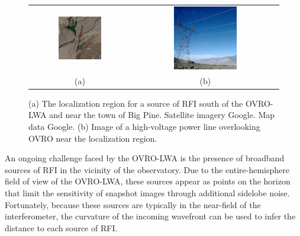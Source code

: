 \begin{bibunit}
\begin{figure}
    \centering
    \begin{tabular}{cc}
        \includegraphics[width=0.45\textwidth]{figures/chapter2/google-maps-rfi-localization} &
        \includegraphics[width=0.45\textwidth]{figures/chapter2/power-line-picture} \\
        (a) & (b) \\
    \end{tabular}
    \caption{
        (a) The localization region for a source of RFI south of the OVRO-LWA and near the town of
        Big Pine. Satellite imagery  Google. Map data  Google.
        (b) Image of a high-voltage power line overlooking OVRO near the localization region.
    }
    \label{fig:rfi-localization}
\end{figure}

An ongoing challenge faced by the OVRO-LWA is the presence of broadband sources of RFI in the
vicinity of the observatory. Due to the entire-hemisphere field of view of the OVRO-LWA, these
sources appear as points on the horizon that limit the sensitivity of snapshot images through
additional sidelobe noise. Fortunately, because these sources are typically in the near-field of the
interferometer, the curvature of the incoming wavefront can be used to infer the distance to each
source of RFI.


\end{bibunit}
